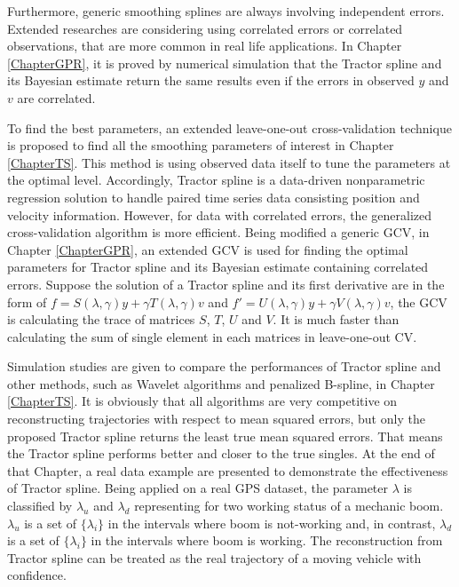 Furthermore, generic smoothing splines are always involving independent errors. Extended researches are considering using correlated errors or correlated observations, that are more common in real life applications. In Chapter \ref{ChapterGPR}, it is proved by numerical simulation that the Tractor spline and its Bayesian estimate return the same results even if the errors in observed $y$ and $v$ are correlated.  


To find the best parameters, an extended leave-one-out cross-validation technique is proposed to find all the smoothing parameters of interest in Chapter \ref{ChapterTS}. This method is using observed data itself to tune the parameters at the optimal level. Accordingly, Tractor spline is a data-driven nonparametric regression solution to handle paired time series data consisting position and velocity information. However, for data with correlated errors, the generalized cross-validation algorithm is more efficient. Being modified a generic GCV, in Chapter \ref{ChapterGPR}, an extended GCV is used for finding the optimal parameters for Tractor spline and its Bayesian estimate containing correlated errors. Suppose the solution of a Tractor spline and its first derivative are in the form of $f=S(\lambda,\gamma)y+\gamma T(\lambda,\gamma)v$ and $f'=U(\lambda,\gamma)y+\gamma V(\lambda,\gamma)v$, the GCV is calculating the trace of matrices $S$, $T$, $U$ and $V$. It is much faster than calculating the sum of single element in each matrices in leave-one-out CV. 


Simulation studies are given to compare the performances of Tractor spline and other methods, such as Wavelet algorithms and penalized B-spline, in Chapter \ref{ChapterTS}. It is obviously that all algorithms are very competitive on reconstructing trajectories with respect to mean squared errors, but only the proposed Tractor spline returns the least true mean squared errors. That means the Tractor spline performs better and closer to the true singles. At the end of that Chapter, a real data example are presented to demonstrate the effectiveness of Tractor spline. Being applied on a real GPS dataset, the parameter $\lambda$ is classified by $\lambda_u$ and $\lambda_d$ representing for two working status of a mechanic boom. $\lambda_u$ is a set of $\{\lambda_i\}$ in the intervals where boom is not-working and, in contrast, $\lambda_d$ is a set of $\{\lambda_i\}$ in the intervals where boom is working. The reconstruction from Tractor spline can be treated as the real trajectory of a moving vehicle with confidence. 


